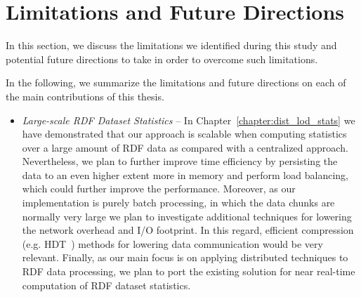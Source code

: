 \section{Limitations and Future Directions}
In this section, we discuss the limitations we identified during this study and potential future directions to take in order to overcome such limitations.

In the following, we summarize the limitations and future directions on each of the main contributions of this thesis.

\begin{itemize}
    \item \textit{Large-scale \gls{RDF} Dataset Statistics} --
    In Chapter~\ref{chapter:dist_lod_stats} we have demonstrated that our approach is scalable when computing statistics over a large amount of \gls{RDF} data as compared with a centralized approach.
    Nevertheless, we plan to further improve time efficiency by persisting the data to an even higher extent more in memory and perform load balancing, which could further improve the performance.
    Moreover, as our implementation is purely batch processing, in which the data chunks are normally very large we plan to investigate additional techniques for lowering the network overhead and I/O footprint.
    In this regard, efficient compression (e.g. \gls{HDT}~\cite{HDTFernandez2013}) methods for lowering data communication would be very relevant.
    Finally, as our main focus is on applying distributed techniques to \gls{RDF} data processing, we plan to port the existing solution for near real-time computation of \gls{RDF} dataset statistics.
    

\end{itemize}
